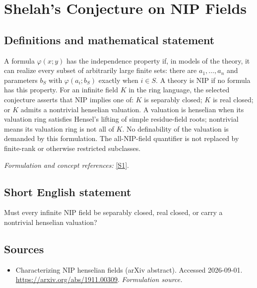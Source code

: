 \documentclass[11pt]{article}
\begin{document}
\section*{\texorpdfstring{Shelah's Conjecture on NIP Fields}{Shelah's Conjecture on NIP Fields}}\label{341}
\subsection{Definitions and mathematical statement}
A formula $\varphi(x;y)$ has the independence property if, in models of the theory, it can realize every subset of arbitrarily large finite sets: there are $a_1,\ldots,a_n$ and parameters $b_S$ with $\varphi(a_i;b_S)$ exactly when $i\in S$. A theory is NIP if no formula has this property. For an infinite field $K$ in the ring language, the selected conjecture asserts that NIP implies one of: $K$ is separably closed; $K$ is real closed; or $K$ admits a nontrivial henselian valuation. A valuation is henselian when its valuation ring satisfies Hensel's lifting of simple residue-field roots; nontrivial means its valuation ring is not all of $K$. No definability of the valuation is demanded by this formulation. The all-NIP-field quantifier is not replaced by finite-rank or otherwise restricted subclasses.
\par\smallskip\textit{Formulation and concept references:} \href{https://arxiv.org/abs/1911.00309}{[S1]}.

\subsection{Short English statement}
Must every infinite NIP field be separably closed, real closed, or carry a nontrivial henselian valuation?
\subsection{Sources}
\begin{itemize}
\item[S1]Characterizing NIP henselian fields (arXiv abstract). Accessed 2026-09-01.
\url{https://arxiv.org/abs/1911.00309}.
\textit{Formulation source.}
\end{itemize}
\end{document}
